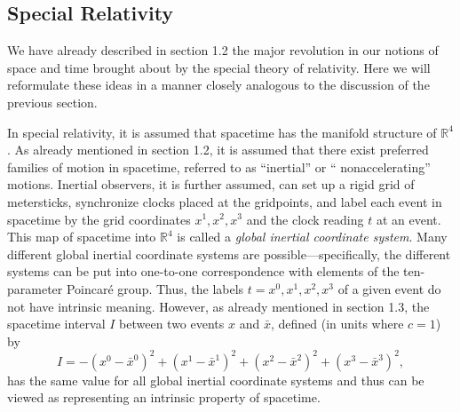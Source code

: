 
\subsection{Special Relativity}\label{sec:4.2}

We have already described in section 1.2 the major revolution in our notions of
space and time brought about by the special theory of relativity. Here we will
reformulate these ideas in a manner closely analogous to the discussion of the
previous section.

In special relativity, it is assumed that spacetime has the manifold structure of
\(\mathbb R^4\). As already mentioned in section 1.2, it is assumed that there
exist preferred families of motion in spacetime, referred to as
\textquotedblleft inertial\textquotedblright{} or \textquotedblleft
nonaccelerating\textquotedblright{} motions. Inertial observers, it is further
assumed, can set up a rigid grid of metersticks, synchronize clocks placed at the
gridpoints, and label each event in spacetime by the grid coordinates
\(x^1,x^2,x^3\) and the clock reading \(t\) at an event. This map of
spacetime into \(\mathbb R^4\) is called a \emph{global inertial coordinate
system}. Many different global inertial coordinate systems are
possible---specifically, the different systems can be put into one-to-one
correspondence with elements of the ten-parameter Poincar\'e group. Thus, the
labels \(t=x^0,x^1,x^2,x^3\) of a given event do not have intrinsic
meaning. However, as already mentioned in section 1.3, the spacetime interval
\(I\) between two events \(x\) and \(\bar x\), defined (in units where
\(c=1\)) by
\begin{equation}
  I=-(x^0-\bar x^0)^2+(x^1-\bar x^1)^2
    +(x^2-\bar x^2)^2+(x^3-\bar x^3)^2 ,
  \tag{4.2.1}\label{eq:4.2.1}
\end{equation}
has the same value for all global inertial coordinate systems and thus can be
viewed as representing an intrinsic property of spacetime.

